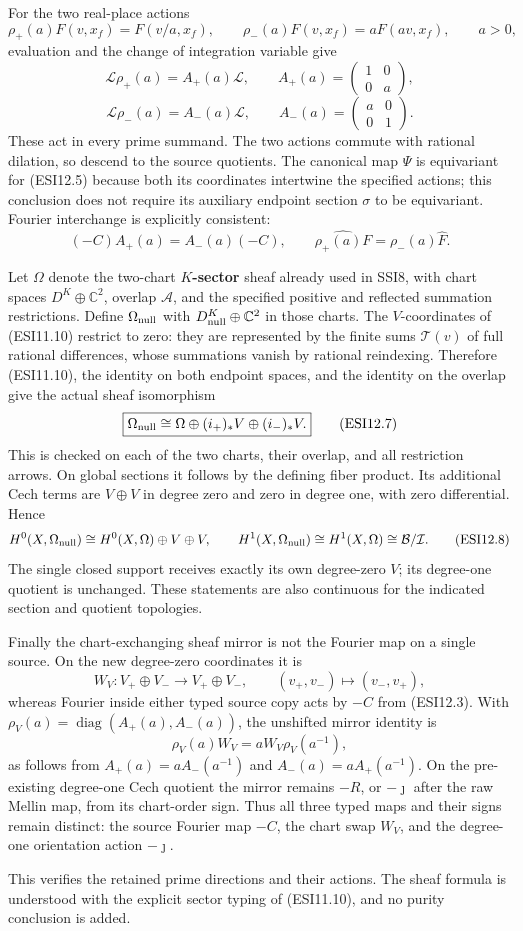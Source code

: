 For the two real-place actions \[
\rho_+(a)F(v,x_f)=F(v/a,x_f),\qquad
\rho_-(a)F(v,x_f)=aF(av,x_f),\qquad a>0,
\tag{ESI12.4}
\] evaluation and the change of integration variable give \[
\mathscr L\rho_+(a)=A_+(a)\mathscr L,
\qquad A_+(a)=\begin{pmatrix}1&0\\0&a\end{pmatrix},
\] \[
\mathscr L\rho_-(a)=A_-(a)\mathscr L,
\qquad A_-(a)=\begin{pmatrix}a&0\\0&1\end{pmatrix}.
\tag{ESI12.5}
\] These act in every prime summand. The two actions commute with
rational dilation, so descend to the source quotients. The canonical map
\(\Psi\) is equivariant for (ESI12.5) because both its coordinates
intertwine the specified actions; this conclusion does not require its
auxiliary endpoint section \(\sigma\) to be equivariant. Fourier
interchange is explicitly consistent: \[
(-C)A_+(a)=A_-(a)(-C),
\qquad \widehat{\rho_+(a)F}=\rho_-(a)\widehat F.
\tag{ESI12.6}
\]

Let \(\Omega\) denote the two-chart \textbf{\(K\)-sector} sheaf already
used in SSI8, with chart spaces \(D^K\oplus\mathbb C^2\), overlap
\(\mathcal A\), and the specified positive and reflected summation
restrictions. Define \(\Omega_{\rm null}\) with
\(D_{\rm null}^K\oplus\mathbb C^2\) in those charts. The
\(V\)-coordinates of (ESI11.10) restrict to zero: they are represented
by the finite sums \(\mathscr T(v)\) of full rational differences, whose
summations vanish by rational reindexing. Therefore (ESI11.10), the
identity on both endpoint spaces, and the identity on the overlap give
the actual sheaf isomorphism \[
\boxed{\Omega_{\rm null}\cong\Omega\oplus(i_+)_*V\oplus(i_-)_*V.}
\tag{ESI12.7}
\] This is checked on each of the two charts, their overlap, and all
restriction arrows. On global sections it follows by the defining fiber
product. Its additional Cech terms are \(V\oplus V\) in degree zero and
zero in degree one, with zero differential. Hence \[
H^0(X,\Omega_{\rm null})\cong H^0(X,\Omega)\oplus V\oplus V,
\qquad
H^1(X,\Omega_{\rm null})\cong H^1(X,\Omega)\cong\mathcal B/\mathcal I.
\tag{ESI12.8}
\] The single closed support receives exactly its own degree-zero \(V\);
its degree-one quotient is unchanged. These statements are also
continuous for the indicated section and quotient topologies.

Finally the chart-exchanging sheaf mirror is not the Fourier map on a
single source. On the new degree-zero coordinates it is \[
W_V:V_+\oplus V_-\longrightarrow V_+\oplus V_-,
\qquad (v_+,v_-)\longmapsto(v_-,v_+),
\tag{ESI12.9}
\] whereas Fourier inside either typed source copy acts by \(-C\) from
(ESI12.3). With \(\rho_V(a)=\operatorname{diag}(A_+(a),A_-(a))\), the
unshifted mirror identity is \[
\rho_V(a)W_V=aW_V\rho_V(a^{-1}),
\tag{ESI12.10}
\] as follows from \(A_+(a)=aA_-(a^{-1})\) and \(A_-(a)=aA_+(a^{-1})\).
On the pre-existing degree-one Cech quotient the mirror remains \(-R\),
or \(-\jmath\) after the raw Mellin map, from its chart-order sign. Thus
all three typed maps and their signs remain distinct: the source Fourier
map \(-C\), the chart swap \(W_V\), and the degree-one orientation
action \(-\jmath\).

This verifies the retained prime directions and their actions. The sheaf
formula is understood with the explicit sector typing of (ESI11.10), and
no purity conclusion is added.
